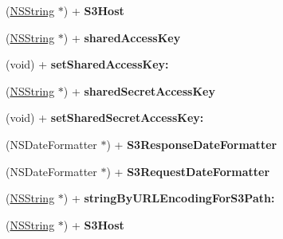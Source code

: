 \begin{DoxyCompactItemize}
\item 
\hypertarget{interface_a_s_i_s3_request_ae49e83f64fb2490185d0a9ff3649e1d3}{
(\hyperlink{class_n_s_string}{\-N\-S\-String} $\ast$) + {\bfseries \-S3\-Host}}
\label{interface_a_s_i_s3_request_ae49e83f64fb2490185d0a9ff3649e1d3}

\item 
\hypertarget{interface_a_s_i_s3_request_aadbf1f29ab30efc3f4640bac7b508d32}{
(\hyperlink{class_n_s_string}{\-N\-S\-String} $\ast$) + {\bfseries shared\-Access\-Key}}
\label{interface_a_s_i_s3_request_aadbf1f29ab30efc3f4640bac7b508d32}

\item 
\hypertarget{interface_a_s_i_s3_request_ad944a2a1b20fc9e4559c8faf4f41b977}{
(void) + {\bfseries set\-Shared\-Access\-Key\-:}}
\label{interface_a_s_i_s3_request_ad944a2a1b20fc9e4559c8faf4f41b977}

\item 
\hypertarget{interface_a_s_i_s3_request_af1a72a1aacc05ce3f5def339d3bfbd5f}{
(\hyperlink{class_n_s_string}{\-N\-S\-String} $\ast$) + {\bfseries shared\-Secret\-Access\-Key}}
\label{interface_a_s_i_s3_request_af1a72a1aacc05ce3f5def339d3bfbd5f}

\item 
\hypertarget{interface_a_s_i_s3_request_aca8ba2305c0cbee1d7ec8553831768ff}{
(void) + {\bfseries set\-Shared\-Secret\-Access\-Key\-:}}
\label{interface_a_s_i_s3_request_aca8ba2305c0cbee1d7ec8553831768ff}

\item 
\hypertarget{interface_a_s_i_s3_request_ac0d60115b59954ffcc2e293c60321a74}{
(\-N\-S\-Date\-Formatter $\ast$) + {\bfseries \-S3\-Response\-Date\-Formatter}}
\label{interface_a_s_i_s3_request_ac0d60115b59954ffcc2e293c60321a74}

\item 
\hypertarget{interface_a_s_i_s3_request_ac2da1def71701c5ed345a2e119dad803}{
(\-N\-S\-Date\-Formatter $\ast$) + {\bfseries \-S3\-Request\-Date\-Formatter}}
\label{interface_a_s_i_s3_request_ac2da1def71701c5ed345a2e119dad803}

\item 
\hypertarget{interface_a_s_i_s3_request_aab8bdd9f5d8970a3bcfca36ec9dee9fb}{
(\hyperlink{class_n_s_string}{\-N\-S\-String} $\ast$) + {\bfseries string\-By\-U\-R\-L\-Encoding\-For\-S3\-Path\-:}}
\label{interface_a_s_i_s3_request_aab8bdd9f5d8970a3bcfca36ec9dee9fb}

\item 
\hypertarget{interface_a_s_i_s3_request_ae49e83f64fb2490185d0a9ff3649e1d3}{
(\hyperlink{class_n_s_string}{\-N\-S\-String} $\ast$) + {\bfseries \-S3\-Host}}
\label{interface_a_s_i_s3_request_ae49e83f64fb2490185d0a9ff3649e1d3}

\end{DoxyCompactItemize}
